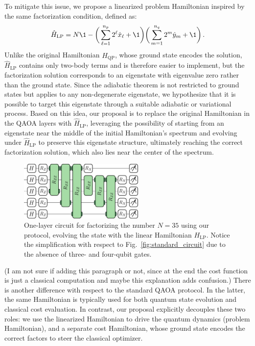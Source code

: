 To mitigate this issue, we propose a linearized problem Hamiltonian inspired by the same factorization condition, defined as:
\begin{equation}
	\hat{H}_\mathrm{LP} = N \1 - \bigg( \sum_{\ell=1}^{n_p} 2^\ell \hat{x}_\ell + \1 \bigg)
	\bigg( \sum_{m=1}^{n_q} 2^m \hat{y}_m + \1 \bigg)\,.
	\label{eq:linear_problem_hamiltonian}
\end{equation}
Unlike the original Hamiltonian $\hat{H}_\mathrm{QP}$, whose ground state encodes the solution, $\hat{H}_\mathrm{LP}$ contains only two-body terms and is therefore easier to implement, but the factorization solution corresponds to an eigenstate with eigenvalue zero rather than the ground state. Since the adiabatic theorem is not restricted to ground states but applies to any non-degenerate eigenstate, we hypothesize that it is possible to target this eigenstate through a suitable adiabatic or variational process. Based on this idea, our proposal is to replace the original Hamiltonian in the QAOA layers with $\hat{H}_\mathrm{LP}$, leveraging the possibility of starting from an eigenstate near the middle of the initial Hamiltonian’s spectrum and evolving under $\hat{H}_\mathrm{LP}$ to preserve this eigenstate structure, ultimately reaching the correct factorization solution, which also lies near the center of the spectrum.

\begin{figure}[h]
    \centering
    \includegraphics[width=0.55\textwidth]{02-factorization/figs/linear_circuit_35.pdf}
    \caption{One-layer circuit for factorizing the number $N=35$ using our protocol, evolving the state with the linear Hamiltonian $H_{\mathrm{LP}}$. Notice the simplification with respect to Fig.~\ref{fig:standard_circuit}
    due to the absence of three- and four-qubit gates.}
    \label{fig:linear_circuit_35.pdf}
\end{figure}

{\color{blue} (I am not sure if adding this paragraph or not, since at the end the cost function is just
a classical computation and maybe this explanation adds confusion.)}
There is another difference with respect to the standard QAOA protocol. In the latter, the same Hamiltonian
is typically used for both quantum state evolution and classical cost evaluation. In contrast,
our proposal explicitly decouples these two roles: we use the linearized Hamiltonian to drive the quantum
dynamics (problem Hamiltonian), and a separate cost Hamiltonian, whose ground state encodes the correct factors
to steer the classical optimizer.